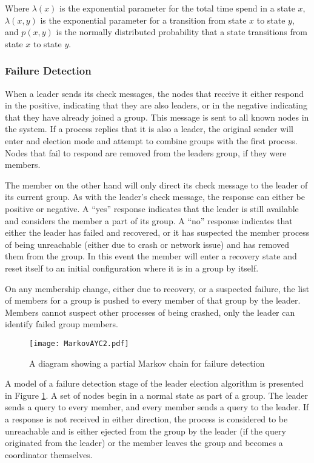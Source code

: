 Where $\lambda(x)$ is the exponential parameter for the total time spend in
a state $x$, $\lambda(x,y)$ is the exponential parameter for a transition from
state $x$ to state $y$, and $p(x,y)$ is the normally distributed probability that
a state transitions from state $x$ to state $y$.

\subsubsection{Failure Detection}
When a leader sends its check messages, the nodes that receive it either
respond in the positive, indicating that they are also leaders, or in the
negative indicating that they have already joined a group. This message is sent
to all known nodes in the system. If a process replies that it is also a
leader, the original sender will enter and election mode and attempt to combine
groups with the first process. Nodes that fail to respond are removed from the
leaders group, if they were members.

The member on the other hand will only direct its check message to the leader
of its current group. As with the leader's check message, the response can
either be positive or negative. A ``yes'' response indicates that the leader is
still available and considers the member a part of its group. A ``no'' response
indicates that either the leader has failed and recovered, or it has suspected
the member process of being unreachable (either due to crash or network issue)
and has removed them from the group. In this event the member will enter a
recovery state and reset itself to an initial configuration where it is in a
group by itself.

On any membership change, either due to recovery, or a suspected failure, the
list of members for a group is pushed to every member of that group by the
leader. Members cannot suspect other processes of being crashed, only the
leader can identify failed group members.

\begin{figure}
\centering
\texttt{[image: MarkovAYC2.pdf]}
\caption{A diagram showing a partial Markov chain for failure detection}
\label{fig:MARKOVAYC}
\end{figure}

A model of a failure detection stage of the leader election algorithm is presented in
Figure \ref{fig:MARKOVAYC}. A set of nodes begin in a normal state as part of a group.
The leader sends a query to every member, and every member sends a query to the leader.
If a response is not received in either direction, the process is considered to be
unreachable and is either ejected from the group by the leader (if the query originated from the leader)
or the member leaves the group and becomes a coordinator themselves.

